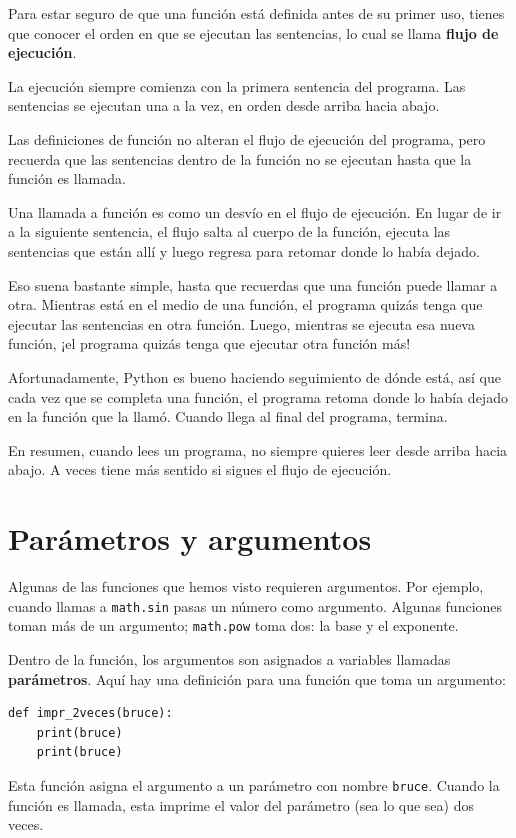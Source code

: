 \documentclass[10pt]{book}
\begin{document}
Para estar seguro de que una función está definida antes de su primer uso,
tienes que conocer el orden en que se ejecutan las sentencias, lo cual se
llama {\bf flujo de ejecución}.

La ejecución siempre comienza con la primera sentencia del programa.
Las sentencias se ejecutan una a la vez, en orden desde arriba hacia abajo.

Las definiciones de función no alteran el flujo de ejecución del
programa, pero recuerda que las sentencias dentro de la función no
se ejecutan hasta que la función es llamada.

Una llamada a función es como un desvío en el flujo de ejecución. En lugar de ir
a la siguiente sentencia, el flujo salta al cuerpo de
la función, ejecuta las sentencias que están allí y luego regresa
para retomar donde lo había dejado.

Eso suena bastante simple, hasta que recuerdas que una función puede
llamar a otra.  Mientras está en el medio de una función, el programa quizás
tenga que ejecutar las sentencias en otra función.  Luego, mientras
se ejecuta esa nueva función, ¡el programa quizás tenga que ejecutar
otra función más!

Afortunadamente, Python es bueno haciendo seguimiento de dónde está, así que cada
vez que se completa una función, el programa retoma donde lo había dejado en
la función que la llamó.  Cuando llega al final del programa,
termina.

En resumen, cuando lees un programa,
no siempre quieres leer desde arriba hacia abajo.  A veces tiene
más sentido si sigues el flujo de ejecución.


\section{Parámetros y argumentos}
\label{parameters}

Algunas de las funciones que hemos visto requieren argumentos. Por
ejemplo, cuando llamas a {\tt math.sin} pasas un número
como argumento.  Algunas funciones toman más de un argumento;
{\tt math.pow} toma dos: la base y el exponente.

Dentro de la función, los argumentos son asignados a
variables llamadas {\bf parámetros}.  Aquí hay una definición para
una función que toma un argumento:

\begin{verbatim}
def impr_2veces(bruce):
    print(bruce)
    print(bruce)
\end{verbatim}
%
Esta función asigna el argumento a un parámetro
con nombre {\tt bruce}.  Cuando la función es llamada, esta imprime el valor del
parámetro (sea lo que sea) dos veces.
\end{document}
